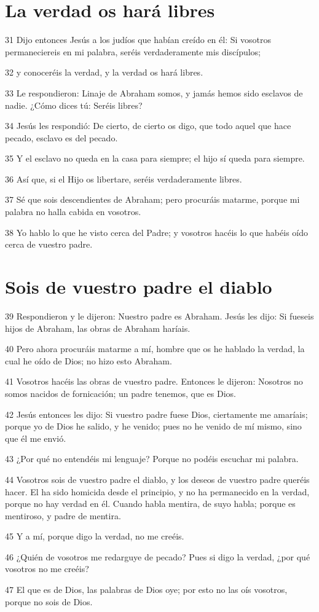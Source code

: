 \section*{La verdad os hará libres}

\par 31 Dijo entonces Jesús a los judíos que habían creído en él: Si vosotros permaneciereis en mi palabra, seréis verdaderamente mis discípulos;
\par 32 y conoceréis la verdad, y la verdad os hará libres.
\par 33 Le respondieron: Linaje de Abraham somos, y jamás hemos sido esclavos de nadie. ¿Cómo dices tú: Seréis libres?
\par 34 Jesús les respondió: De cierto, de cierto os digo, que todo aquel que hace pecado, esclavo es del pecado.
\par 35 Y el esclavo no queda en la casa para siempre; el hijo sí queda para siempre.
\par 36 Así que, si el Hijo os libertare, seréis verdaderamente libres.
\par 37 Sé que sois descendientes de Abraham; pero procuráis matarme, porque mi palabra no halla cabida en vosotros.
\par 38 Yo hablo lo que he visto cerca del Padre; y vosotros hacéis lo que habéis oído cerca de vuestro padre.

\section*{Sois de vuestro padre el diablo}

\par 39 Respondieron y le dijeron: Nuestro padre es Abraham. Jesús les dijo: Si fueseis hijos de Abraham, las obras de Abraham haríais.
\par 40 Pero ahora procuráis matarme a mí, hombre que os he hablado la verdad, la cual he oído de Dios; no hizo esto Abraham.
\par 41 Vosotros hacéis las obras de vuestro padre. Entonces le dijeron: Nosotros no somos nacidos de fornicación; un padre tenemos, que es Dios.
\par 42 Jesús entonces les dijo: Si vuestro padre fuese Dios, ciertamente me amaríais; porque yo de Dios he salido, y he venido; pues no he venido de mí mismo, sino que él me envió.
\par 43 ¿Por qué no entendéis mi lenguaje? Porque no podéis escuchar mi palabra.
\par 44 Vosotros sois de vuestro padre el diablo, y los deseos de vuestro padre queréis hacer. El ha sido homicida desde el principio, y no ha permanecido en la verdad, porque no hay verdad en él. Cuando habla mentira, de suyo habla; porque es mentiroso, y padre de mentira.
\par 45 Y a mí, porque digo la verdad, no me creéis.
\par 46 ¿Quién de vosotros me redarguye de pecado? Pues si digo la verdad, ¿por qué vosotros no me creéis?
\par 47 El que es de Dios, las palabras de Dios oye; por esto no las oís vosotros, porque no sois de Dios.

